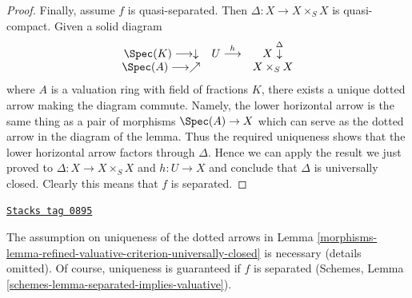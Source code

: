 \begin{proof}
\medskip\noindent
Finally, assume $f$ is quasi-separated. Then $\Delta : X \to X \times_S X$
is quasi-compact. Given a solid diagram
$$
\begin{array}{ccc}\Spec(K) \longrightarrow\downarrow & U \overset{h}{\longrightarrow} & X \overset{\Delta}{\downarrow} \\ \Spec(A) \longrightarrow\nearrow &  & X \times_S X\end{array}
$$
where $A$ is a valuation ring with field of fractions $K$, there
exists a unique dotted arrow making the diagram commute. Namely,
the lower horizontal arrow is the same thing as a pair of morphisms
$\Spec(A) \to X$ which can serve as the dotted arrow in the diagram
of the lemma. Thus the required uniqueness shows that the lower
horizontal arrow factors through $\Delta$.
Hence we can apply the result we just proved to
$\Delta : X \to X \times_S X$ and $h : U \to X$ and conclude that
$\Delta$ is universally closed. Clearly this means that $f$
is separated.
\end{proof}

\begin{remark}
\label{morphisms-remark-check-val-on-open}
\href{https://stacks.math.columbia.edu/tag/0895}{\texttt{Stacks tag 0895}}

The assumption on uniqueness of the dotted arrows in
Lemma \ref{morphisms-lemma-refined-valuative-criterion-universally-closed}
is necessary (details omitted). Of course, uniqueness is guaranteed if
$f$ is separated
(Schemes, Lemma \ref{schemes-lemma-separated-implies-valuative}).
\end{remark}

